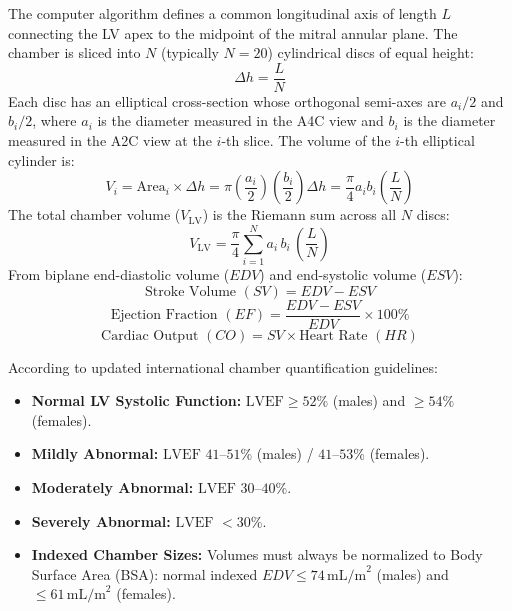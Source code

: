 \documentclass[11pt,a4paper]{article}
\begin{document}
The computer algorithm defines a common longitudinal axis of length $L$ connecting the LV apex to the midpoint of the mitral annular plane. The chamber is sliced into $N$ (typically $N = 20$) cylindrical discs of equal height:
\begin{equation}
    \Delta h = \frac{L}{N}
\end{equation}
Each disc has an elliptical cross-section whose orthogonal semi-axes are $a_i / 2$ and $b_i / 2$, where $a_i$ is the diameter measured in the A4C view and $b_i$ is the diameter measured in the A2C view at the $i$-th slice. The volume of the $i$-th elliptical cylinder is:
\begin{equation}
    V_i = \text{Area}_i \times \Delta h = \pi \left( \frac{a_i}{2} \right) \left( \frac{b_i}{2} \right) \Delta h = \frac{\pi}{4} a_i b_i \left( \frac{L}{N} \right)
\end{equation}
The total chamber volume ($V_{\text{LV}}$) is the Riemann sum across all $N$ discs:
\begin{equation}
    V_{\text{LV}} = \frac{\pi}{4} \sum_{i=1}^{N} a_i \, b_i \, \left( \frac{L}{N} \right)
\end{equation}
From biplane end-diastolic volume ($EDV$) and end-systolic volume ($ESV$):
\begin{equation}
    \text{Stroke Volume } (SV) = EDV - ESV
\end{equation}
\begin{equation}
    \text{Ejection Fraction } (EF) = \frac{EDV - ESV}{EDV} \times 100\%
\end{equation}
\begin{equation}
    \text{Cardiac Output } (CO) = SV \times \text{Heart Rate } (HR)
\end{equation}

\begin{guidelinesbox}
According to updated international chamber quantification guidelines:
\begin{itemize}[leftmargin=*]
    \item \textbf{Normal LV Systolic Function:} $\text{LVEF} \ge 52\%$ (males) and $\ge 54\%$ (females).
    \item \textbf{Mildly Abnormal:} $\text{LVEF } 41\text{--}51\%$ (males) / $41\text{--}53\%$ (females).
    \item \textbf{Moderately Abnormal:} $\text{LVEF } 30\text{--}40\%$.
    \item \textbf{Severely Abnormal:} $\text{LVEF } < 30\%$.
    \item \textbf{Indexed Chamber Sizes:} Volumes must always be normalized to Body Surface Area (BSA): normal indexed $EDV \le 74\,\text{mL/m}^2$ (males) and $\le 61\,\text{mL/m}^2$ (females).
\end{itemize}
\end{guidelinesbox}
\end{document}
